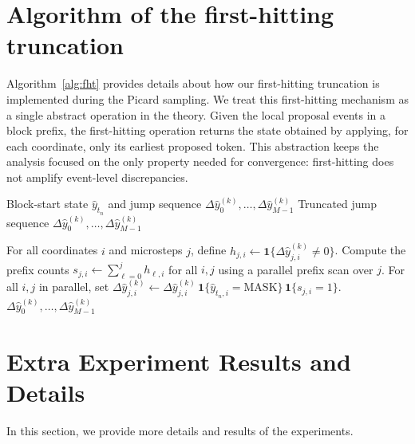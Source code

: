 \documentclass{article}
\begin{document}
\section{Algorithm of the first-hitting truncation}
\label{appd:FHS_alg}
Algorithm~\ref{alg:fht} provides details about how our first-hitting truncation is implemented during the Picard sampling. We treat this first-hitting mechanism as a single abstract operation in the theory. Given the local proposal events in a block prefix, the first-hitting operation returns the state obtained by applying, for each coordinate, only its earliest proposed token. This abstraction keeps the analysis focused on the only property needed for convergence: first-hitting does not amplify event-level discrepancies.

\begin{algorithm}[ht]
\caption{First-Hitting Truncation (FHT)}
\label{alg:fht}
\begin{algorithmic}[1]
\REQUIRE Block-start state $\widehat y_{t_n}$ and jump sequence
$\Delta\widehat y^{(k)}_0,\ldots,\Delta\widehat y^{(k)}_{M-1}$
\ENSURE Truncated jump sequence
$\Delta\widehat y^{(k)}_0,\ldots,\Delta\widehat y^{(k)}_{M-1}$

\STATE For all coordinates $i$ and microsteps $j$, define
$h_{j,i}\gets \mathbf 1\{\Delta\widehat y^{(k)}_{j,i}\neq 0\}$.
\STATE Compute the prefix counts
$s_{j,i}\gets\sum_{\ell=0}^{j}h_{\ell,i}$
for all $i,j$ using a parallel prefix scan over $j$.
\STATE For all $i,j$ in parallel, set $\Delta\widehat y^{(k)}_{j,i}
\gets
\Delta\widehat y^{(k)}_{j,i}\,
\mathbf 1\{\widehat y_{t_n,i}=\mathrm{MASK}\}\,
\mathbf 1\{s_{j,i}=1\}.
$
\RETURN $\Delta\widehat y^{(k)}_0,\ldots,\Delta\widehat y^{(k)}_{M-1}$
\end{algorithmic}
\end{algorithm}


\section{Extra Experiment Results and Details}
In this section, we provide more details and results of the experiments.
\end{document}
